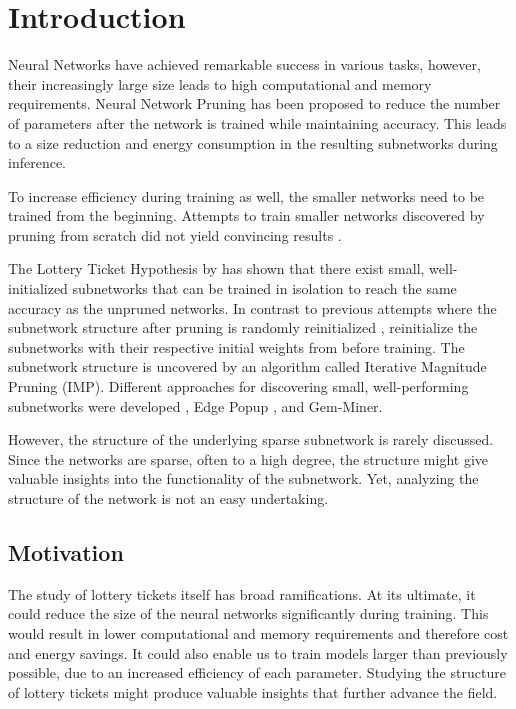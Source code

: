 \chapter{Introduction}
Neural Networks have achieved remarkable success in various tasks, however, their increasingly large size leads to high computational and memory requirements.
Neural Network Pruning \autocite{LeCun, OptimalBrainSurgeon, HanEtAl15, PruningFiltersForEfficientConvets} has been proposed to reduce the number of parameters after the network is trained while maintaining accuracy.
This leads to a size reduction \autocite{HanEtAl15} and energy consumption \autocite{YangCS17} in the resulting subnetworks during inference.

To increase efficiency during training as well, the smaller networks need to be trained from the beginning. Attempts to train smaller networks discovered by pruning from scratch did not yield convincing results \autocite{HanEtAl15, PruningFiltersForEfficientConvets}.

The Lottery Ticket Hypothesis by \textcite{LTH} has shown that there exist small, well-initialized subnetworks that can be trained in isolation to reach the same accuracy as the unpruned networks. 
In contrast to previous attempts where the subnetwork structure after pruning is randomly reinitialized \autocite{HanEtAl15, PruningFiltersForEfficientConvets}, \textcite{LTH} reinitialize the subnetworks with their respective initial weights from before training.
The subnetwork structure is uncovered by an algorithm called Iterative Magnitude Pruning (IMP).
Different approaches for discovering small, well-performing subnetworks were developed \autocite{Supermasks}, Edge Popup \autocite{EdgePopup}, and Gem-Miner\autocite{RareGems}.

However, the structure of the underlying sparse subnetwork is rarely discussed.
Since the networks are sparse, often to a high degree, the structure might give valuable insights into the functionality of the subnetwork.
Yet, analyzing the structure of the network is not an easy undertaking.

\section{Motivation}
The study of lottery tickets itself has broad ramifications.
At its ultimate, it could reduce the size of the neural networks significantly during training.
This would result in lower computational and memory requirements and therefore cost and energy savings.
It could also enable us to train models larger than previously possible, due to an increased efficiency of each parameter.
Studying the structure of lottery tickets might produce valuable insights that further advance the field.


